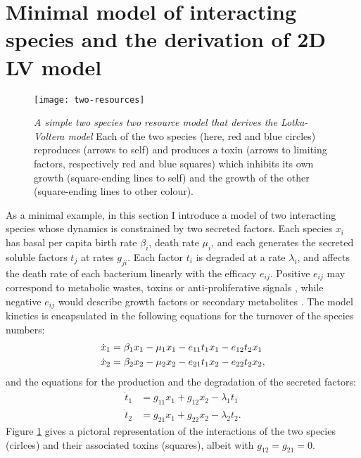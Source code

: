 \section{Minimal model of interacting species and the derivation of 2D LV model} %
\begin{figure}[h]
	\centering
	\texttt{[image: two-resources]}
	\caption{\emph{A simple two species two resource model that derives the Lotka-Voltera model} Each of the two species (here, red and blue circles) reproduces (arrows to self) and produces a toxin (arrows to limiting factors, respectively red and blue squares) which inhibits its own growth (square-ending lines to self) and the growth of the other (square-ending lines to other colour). } \label{toxinsfig}
\end{figure}%

As a minimal example, in this section I introduce a model of two interacting species whose dynamics is constrained by two secreted factors. Each species $x_i$ has basal per capita birth rate $\beta_i$, death rate $\mu_i$, and each generates the secreted soluble factors $t_j$ at rates $g_{ji}$. Each factor $t_i$ is degraded at a rate $\lambda_i$, and affects the death rate of each bacterium linearly with the efficacy $e_{ij}$. Positive $e_{ij}$ may correspond to metabolic wastes, toxins or anti-proliferative signals \cite{Jacob1989,Maplestone1992,VanMelderen2009,Rankin2012,Shen2015,Wynn2015}, while negative $e_{ij}$ would describe growth factors or secondary metabolites \cite{Maplestone1992,Reya2001,Wink2003}. The model kinetics is encapsulated in the following equations for the turnover of the species numbers:
\begin{align}
\dot{x}_1 &= \beta_1 x_1 - \mu_1 x_1 - e_{11} t_1 x_1 - e_{12} t_2 x_1 \notag \\
\dot{x}_2 &= \beta_2 x_2 - \mu_2 x_2 - e_{21} t_1 x_2 - e_{22} t_2 x_2 \label{eq-x-tox},
\end{align}
and the equations for the production and the degradation of the secreted factors:
\begin{align}
\dot{t}_1 &= g_{11} x_1 + g_{12}x_2 - \lambda_1 t_1  \nonumber \\
\dot{t}_2 &= g_{21} x_1 + g_{22}x_2 - \lambda_2 t_2. \label{eq-tox}
\end{align}
Figure \ref{toxinsfig} gives a pictoral representation of the interactions of the two species (cirlces) and their associated toxins (squares), albeit with $g_{12}=g_{21}=0$. 

